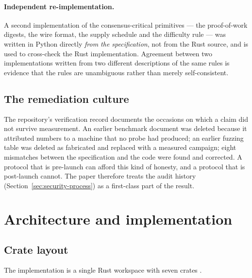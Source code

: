 \documentclass{article}
\begin{document}
\paragraph{Independent re-implementation.} A second implementation of the
consensus-critical primitives --- the proof-of-work digests, the wire format,
the supply schedule and the difficulty rule --- was written in Python directly
\emph{from the specification}, not from the Rust source, and is used to
cross-check the Rust implementation. Agreement between two implementations
written from two different descriptions of the same rules is evidence that the
rules are unambiguous rather than merely self-consistent.

\subsection{The remediation culture}

The repository's verification record \cite{srct-status} documents the
occasions on which a claim did not survive measurement. An earlier benchmark
document was deleted because it attributed numbers to a machine that no probe
had produced; an earlier fuzzing table was deleted as fabricated and replaced
with a measured campaign; eight mismatches between the specification and the
code were found and corrected. A protocol that is pre-launch can afford this
kind of honesty, and a protocol that is post-launch cannot. The paper therefore
treats the audit history (Section~\ref{sec:security-process}) as a first-class
part of the result.


\section{Architecture and implementation}
\label{sec:architecture}

\subsection{Crate layout}

The implementation is a single Rust workspace with seven crates
\cite{srct-repo}.
\end{document}
